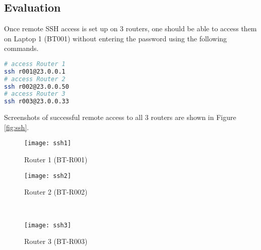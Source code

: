 \subsection{Evaluation}

Once remote SSH access is set up on 3 routers, one should be able to access them on Laptop 1 (BT001) without entering the password using the following commands.

\begin{lstlisting}[language=sh]
# access Router 1
ssh r001@23.0.0.1 
# access Router 2
ssh r002@23.0.0.50
# access Router 3
ssh r003@23.0.0.33
\end{lstlisting}

Screenshots of successful remote access to all 3 routers are shown in Figure \ref{fig:ssh}.

\begin{figure*}[t!]
    \centering
    \begin{subfigure}[b]{0.67\textwidth}
        \centering
        \texttt{[image: ssh1]}
        \caption{Router 1 (BT-R001)}
    \end{subfigure}
    \hfill
    \begin{minipage}[b]{0.3\textwidth}
	    \begin{subfigure}[b]{\linewidth}
	        \centering
	        \texttt{[image: ssh2]}
	        \caption{Router 2 (BT-R002)}
	    \end{subfigure}
	    \\
	    \begin{subfigure}[b]{\linewidth}
	        \centering
	        \texttt{[image: ssh3]}
	        \caption{Router 3 (BT-R003)}
	    \end{subfigure}
	\end{minipage}
    \caption{Sucessful remote SSH access to all 3 routers from Laptop 1 (BT001).}
    \label{fig:ssh}
\end{figure*}




